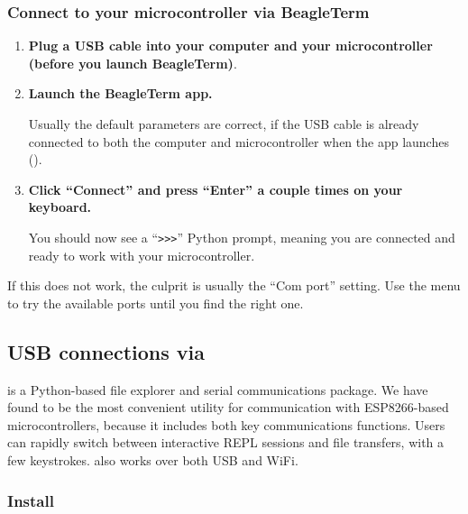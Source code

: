 \subsubsection{\howto{} Connect to your microcontroller via BeagleTerm}
\begin{enumerate}
	\item \textbf{Plug a USB cable into your computer and your microcontroller (before you launch BeagleTerm)}. 
	\item \textbf{Launch the BeagleTerm app.} 
	
	Usually the default parameters are correct, if the USB cable is already connected to both the computer and microcontroller when the app launches ().
	\item \textbf{Click ``Connect'' and press ``Enter'' a couple times on your keyboard.} 
	
	You should now see a ``\verb|>>>|'' Python prompt, meaning you are connected and ready to work with your microcontroller.
\end{enumerate}
If this does not work, the culprit is usually the ``Com port'' setting.
Use the menu to try the available ports until you find the right one.


\subsection{USB connections via \mpfshell}
\mpfshell is a Python-based file explorer and serial communications package. 
We have found \mpfshell to be the most convenient utility for communication with ESP8266-based microcontrollers, because it includes both key communications functions.
Users can rapidly switch between interactive REPL sessions and file transfers, with a few keystrokes.
\mpfshell also works over both USB and WiFi.

\subsubsection{\howto Install \mpfshell}

